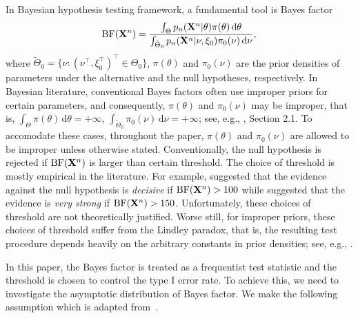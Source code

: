 \documentclass[11pt]{article}
\newcommand{\myT}{\intercal}
\theoremstyle{plain}
\theoremstyle{definition}
\theoremstyle{remark}
\begin{document}
In Bayesian hypothesis testing framework, a fundamental tool is Bayes factor
\begin{equation*}
    \text{BF}(\mathbf{X}^{n})=
    \frac{\int_{\Theta} p_n(\mathbf{X}^{n}|\theta)\pi(\theta)\, \mathrm d\theta}{\int_{\tilde{\Theta}_0}p_n(\mathbf{X}^{n}|\nu,\xi_0)\pi_0(\nu)\, \mathrm d\nu},
\end{equation*}
where $\tilde{\Theta}_0=\{\nu: (\nu^\myT ,\xi_0^\myT )^\myT \in \Theta_0\}$, $\pi(\theta)$ and $\pi_0(\nu)$ are the prior densities of parameters under the alternative and the null hypotheses, respectively.
In Bayesian literature, conventional Bayes factors often use improper priors for certain parameters, and consequently, $\pi(\theta)$ and $\pi_0 (\nu)$ may be improper, that is, $\int_{\Theta} \pi(\theta) \, \mathrm d \theta = + \infty$, $\int_{\tilde \Theta_0} \pi_0 (\nu) \, \mathrm d \nu  = + \infty$; see, e.g., \cite{berger2001Obj}, Section 2.1.
To accomodate these cases, throughout the paper, $\pi(\theta)$ and $\pi_0(\nu)$ are allowed to be improper unless otherwise stated.
Conventionally, the null hypothesis is rejected if $\text{BF}(\mathbf{X}^n)$ is larger than certain threshold.
The choice of threshold is mostly empirical in the literature.
For example, \cite{Jeffreys1961} suggested that the evidence against the null hypothesis is \emph{decisive} if $\text{BF}(\mathbf{X}^n)>100$ while \cite{Robert1995Bayes} suggested that the evidence is \emph{very strong} if $\text{BF}(\mathbf{X}^n) > 150$.
Unfortunately, these choices of threshold  are not theoretically justified.
Worse still, for improper priors, these choices of threshold suffer from the Lindley paradox, that is, the resulting test procedure depends heavily on the arbitrary constants in prior densities; see, e.g., \cite{Shafer1982}.

In this paper, the Bayes factor is treated as a frequentist test statistic and the threshold is chosen to control the type I error rate.
To achieve this, we need to investigate the asymptotic distribution of Bayes factor.
We make the following assumption which is adapted from~\cite{Kleijn2012The}.
\end{document}
